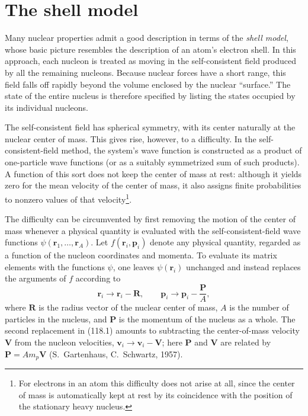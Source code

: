 \section{The shell model}

Many nuclear properties admit a good description in terms of the \emph{shell
model}, whose basic picture resembles the description of an atom's electron
shell. In this approach, each nucleon is treated as moving in the
self-consistent field produced by all the remaining nucleons. Because nuclear
forces have a short range, this field falls off rapidly beyond the volume
enclosed by the nuclear ``surface.'' The state of the entire nucleus is
therefore specified by listing the states occupied by its individual
nucleons.

The self-consistent field has spherical symmetry, with its center naturally at
the nuclear center of mass. This gives rise, however, to a difficulty. In the
self-consistent-field method, the system's wave function is constructed as a
product of one-particle wave functions (or as a suitably symmetrized sum of
such products). A function of this sort does not keep the center of mass at
rest: although it yields zero for the mean velocity of the center of mass, it
also assigns finite probabilities to nonzero values of that
velocity\footnote{For electrons in an atom this difficulty does not arise at
all, since the center of mass is automatically kept at rest by its coincidence
with the position of the stationary heavy nucleus.}.

The difficulty can be circumvented by first removing the motion of the center
of mass whenever a physical quantity is evaluated with the
self-consistent-field wave functions
$\psi(\mathbf r_1,\ldots,\mathbf r_A)$. Let
$f(\mathbf r_i,\mathbf p_i)$ denote any physical quantity, regarded as a
function of the nucleon coordinates and momenta. To evaluate its matrix
elements with the functions $\psi$, one leaves $\psi(\mathbf r_i)$ unchanged
and instead replaces the arguments of $f$ according to
\begin{equation}
 \mathbf r_i\to\mathbf r_i-\mathbf R,\qquad
 \mathbf p_i\to\mathbf p_i-\frac{\mathbf P}{A},
 \tag{118.1}
\end{equation}
where $\mathbf R$ is the radius vector of the nuclear center of mass, $A$ is
the number of particles in the nucleus, and $\mathbf P$ is the momentum of the
nucleus as a whole. The second replacement in (118.1) amounts to subtracting
the center-of-mass velocity $\mathbf V$ from the nucleon velocities,
$\mathbf v_i\to\mathbf v_i-\mathbf V$; here $\mathbf P$ and $\mathbf V$ are
related by $\mathbf P=Am_p\mathbf V$ (S.~Gartenhaus, C.~Schwartz, 1957).

